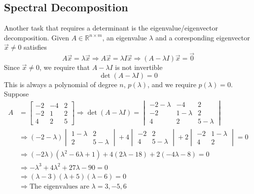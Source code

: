 
\subsection{Spectral Decomposition}

Another task that requires a determinant is the eigenvalue/eigenvector decomposition.  
Given $A\in\mathbb{R}^{n\times m}$, an eigenvalue $\lambda$ and 
a coresponding eigenvector $\Vec{x} \neq 0 $ satisfies
%
\begin{equation*}
  A \Vec{x} = \lambda \Vec{x} \Rightarrow A\Vec{x}=\lambda I \Vec{x}
  \Rightarrow (A-\lambda I) \Vec{x} = \Vec{0}
\end{equation*}
Since $\Vec{x} \neq 0$, we require that $A-\lambda I$ is not invertible
%
\begin{equation*}
  \det(A-\lambda I) = 0
\end{equation*}
This is always a polynomial of degree $n$, $p(\lambda)$, and we require $p(\lambda)=0$. 
Suppose
%
\begin{align*}
  A &= 
  \begin{bmatrix}
    -2 & -4 & 2 \\
    -2 & 1 & 2 \\
    4 & 2 & 5
  \end{bmatrix} 
  \Rightarrow \det(A-\lambda I) = 
            \begin{vmatrix}
    -2-\lambda & -4 & 2 \\
    -2 & 1-\lambda & 2 \\
    4 & 2 & 5-\lambda
  \end{vmatrix} \\
    &\Rightarrow
      (-2 - \lambda)
      \begin{vmatrix}
        1-\lambda & 2 \\
        2 & 5-\lambda
      \end{vmatrix}
      + 4
      \begin{vmatrix}
        -2 & 2 \\
        4 & 5-\lambda
      \end{vmatrix}
      + 2
      \begin{vmatrix}
        -2 & 1-\lambda \\
        4 & 2
      \end{vmatrix} = 0 \\
    &\Rightarrow
      (-2 \lambda) (\lambda^2 - 6 \lambda + 1) + 4 (2\lambda-18) + 2(-4\lambda-8) = 0 \\
    &\Rightarrow -\lambda^3 + 4 \lambda^2 +27 \lambda - 90 =0 \\
    &\Rightarrow (\lambda-3)(\lambda+5)(\lambda -6) = 0 \\
    &\Rightarrow \text{The eigenvalues are } \lambda=3, -5, 6
\end{align*}

